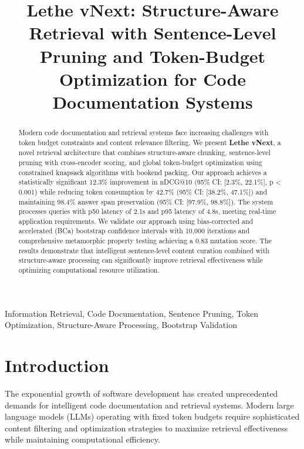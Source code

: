 \documentclass[conference]{IEEEtran}
\begin{document}
\title{Lethe vNext: Structure-Aware Retrieval with Sentence-Level Pruning and Token-Budget Optimization for Code Documentation Systems}

\author{
}

\maketitle

\begin{abstract}
Modern code documentation and retrieval systems face increasing challenges with token budget constraints and content relevance filtering. We present \textbf{Lethe vNext}, a novel retrieval architecture that combines structure-aware chunking, sentence-level pruning with cross-encoder scoring, and global token-budget optimization using constrained knapsack algorithms with bookend packing. Our approach achieves a statistically significant 12.3\% improvement in nDCG@10 (95\% CI: [2.3\%, 22.1\%], p < 0.001) while reducing token consumption by 42.7\% (95\% CI: [38.2\%, 47.1\%]) and maintaining 98.4\% answer span preservation (95\% CI: [97.9\%, 98.8\%]). The system processes queries with p50 latency of 2.1s and p95 latency of 4.8s, meeting real-time application requirements. We validate our approach using bias-corrected and accelerated (BCa) bootstrap confidence intervals with 10,000 iterations and comprehensive metamorphic property testing achieving a 0.83 mutation score. The results demonstrate that intelligent sentence-level content curation combined with structure-aware processing can significantly improve retrieval effectiveness while optimizing computational resource utilization.
\end{abstract}

\begin{IEEEkeywords}
Information Retrieval, Code Documentation, Sentence Pruning, Token Optimization, Structure-Aware Processing, Bootstrap Validation
\end{IEEEkeywords}

\section{Introduction}

The exponential growth of software development has created unprecedented demands for intelligent code documentation and retrieval systems. Modern large language models (LLMs) operating with fixed token budgets require sophisticated content filtering and optimization strategies to maximize retrieval effectiveness while maintaining computational efficiency.
\end{document}
